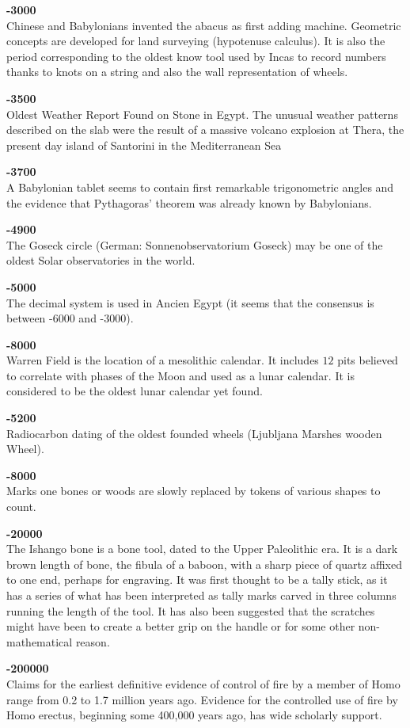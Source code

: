 \textbf{-3000}\\
Chinese and Babylonians invented the abacus as first adding machine. Geometric concepts are developed for land surveying (hypotenuse calculus). It is also the period corresponding to the oldest know tool used by Incas to record numbers thanks to knots on a string and also the wall representation of wheels.

\textbf{-3500}\\
Oldest Weather Report Found on Stone in Egypt. The unusual weather patterns described on the slab were the result of a massive volcano explosion at Thera, the present day island of Santorini in the Mediterranean Sea

\textbf{-3700}\\
A Babylonian tablet seems to contain first remarkable trigonometric angles and the evidence that Pythagoras' theorem was already known by Babylonians.

\textbf{-4900}\\
The Goseck circle (German: Sonnenobservatorium Goseck) may be one of the oldest Solar observatories in the world.

\textbf{-5000}\\
The decimal system is used in Ancien Egypt (it seems that the consensus is between -6000 and -3000).

\textbf{-8000}\\
Warren Field is the location of a mesolithic calendar. It includes $12$ pits believed to correlate with phases of the Moon and used as a lunar calendar. It is considered to be the oldest lunar calendar yet found.

\textbf{-5200}\\
Radiocarbon dating of the oldest founded wheels (Ljubljana Marshes wooden Wheel).

\textbf{-8000}\\
Marks one bones or woods are slowly replaced by tokens of various shapes to count.

\textbf{-20000}\\
The Ishango bone is a bone tool, dated to the Upper Paleolithic era. It is a dark brown length of bone, the fibula of a baboon, with a sharp piece of quartz affixed to one end, perhaps for engraving. It was first thought to be a tally stick, as it has a series of what has been interpreted as tally marks carved in three columns running the length of the tool. It has also been suggested that the scratches might have been to create a better grip on the handle or for some other non-mathematical reason.

\textbf{-200000}\\
Claims for the earliest definitive evidence of control of fire by a member of Homo range from 0.2 to 1.7 million years ago. Evidence for the controlled use of fire by Homo erectus, beginning some 400,000 years ago, has wide scholarly support.